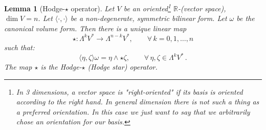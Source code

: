 \documentclass[a4paper,11pt,titlepage, article, oneside]{memoir}
\numberwithin{equation}{section}
\newtheorem{lemma}[theorem]{Lemma}
\theoremstyle{definition}
\theoremstyle{remark}
\newcommand{\rfield}{\mathbb{R}}
\begin{document}
\begin{lemma}[Hodge-$\star$ operator]
Let $V$ be an oriented\footnote{In 3 dimensions, a vector space is "right-oriented" if its basis is oriented according to the right hand. In general dimension there is not such a thing as a preferred orientation. In this case we just want to say that we arbitrarily chose an orientation for our basis.} $\rfield$-(vector space), $\dim V =n$. Let $\langle \cdot, \cdot \rangle$ be a non-degenerate, symmetric bilinear form. Let $\omega$ be the canonical volume form. Then there is a unique linear map
\begin{equation}
\star \colon \Lambda^k V^* \rightarrow \Lambda^{n-k}V^* , \qquad \forall\, k=0, 1, \ldots, n
\end{equation}
such that:
$$\langle \eta, \zeta \rangle \omega = \eta \wedge \star \zeta, \qquad \forall \, \eta, \zeta \in \Lambda^k V^* \, .$$
The map $\star$ is the Hodge-$\star$ (Hodge star) operator.
\end{lemma}	
\end{document}
